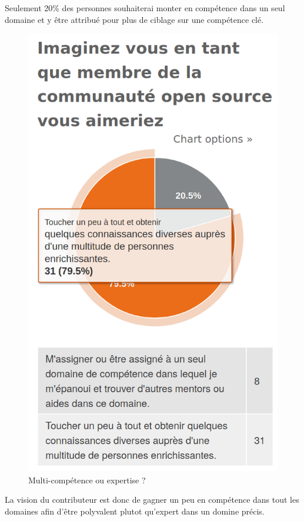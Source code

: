 			Seulement 20\% des personnes souhaiterai monter en compétence dans un seul domaine et y être attribué pour plus de ciblage sur une compétence clé.

			\begin{figure}[!htb]
				\center
				\includegraphics[scale=0.28]{./img/multicompetence}
				\caption{Multi-compétence ou expertise ?}
			\end{figure}

			La vision du contributeur est donc de gagner un peu en compétence dans tout les domaines afin d'être polyvalent plutot qu'expert dans un domine précis.

